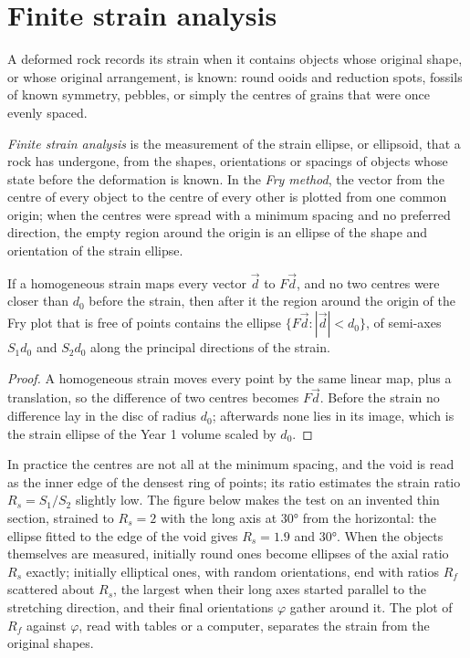 \section{Finite strain analysis}\label{sec:b3:structural-analysis:strain}

A deformed rock records its strain when it contains objects whose original
shape, or whose original arrangement, is known: round ooids and reduction
spots, fossils of known symmetry, pebbles, or simply the centres of grains
that were once evenly spaced.

\begin{definition}\label{def:b3:structural-analysis:strain-analysis}
\emph{Finite strain analysis} is the measurement
of the strain ellipse, or ellipsoid, that a rock has undergone, from the
shapes, orientations or spacings of objects whose state before the
deformation is known. In the \emph{Fry method}, the vector
from the centre of every object to the centre of every other is plotted from
one common origin; when the centres were spread with a minimum spacing and no
preferred direction, the empty region around the origin is an ellipse of the
shape and orientation of the strain ellipse.
\end{definition}

\begin{proposition}\label{prop:b3:structural-analysis:fry}
If a homogeneous strain maps every vector $\vec d$ to $F\vec d$, and no two
centres were closer than $d_0$ before the strain, then after it the region
around the origin of the Fry plot that is free of points contains the ellipse
$\{F\vec d : |\vec d| < d_0\}$, of semi-axes $S_1d_0$ and $S_2d_0$ along the
principal directions of the strain.
\end{proposition}

\begin{proof}
A homogeneous strain moves every point by the same linear map, plus a
translation, so the difference of two centres becomes $F\vec d$. Before the
strain no difference lay in the disc of radius $d_0$; afterwards none lies in
its image, which is the strain ellipse of the Year 1 volume scaled by $d_0$.
\end{proof}

In practice the centres are not all at the minimum spacing, and the void is
read as the inner edge of the densest ring of points; its ratio estimates the
strain ratio $R_s = S_1/S_2$ slightly low. The figure below makes the test on
an invented thin section, strained to $R_s = 2$ with the long axis at
\ang{30} from the horizontal: the ellipse fitted to the edge of the void gives
$R_s = 1.9$ and \ang{30}. When the objects themselves are measured, initially
round ones become ellipses of the axial ratio $R_s$ exactly; initially
elliptical ones, with random orientations, end with ratios $R_f$ scattered
about $R_s$, the largest when their long axes started parallel to the
stretching direction, and their final orientations $\varphi$ gather around
it. The plot of $R_f$ against $\varphi$, read with tables or a computer,
separates the strain from the original shapes.

